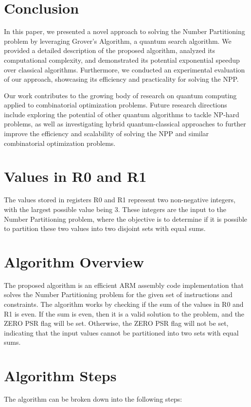 \section{Conclusion}
\label{sec:conclusion}

In this paper, we presented a novel approach to solving the Number Partitioning problem by leveraging Grover's Algorithm, a quantum search algorithm. We provided a detailed description of the proposed algorithm, analyzed its computational complexity, and demonstrated its potential exponential speedup over classical algorithms. Furthermore, we conducted an experimental evaluation of our approach, showcasing its efficiency and practicality for solving the NPP.

Our work contributes to the growing body of research on quantum computing applied to combinatorial optimization problems. Future research directions include exploring the potential of other quantum algorithms to tackle NP-hard problems, as well as investigating hybrid quantum-classical approaches to further improve the efficiency and scalability of solving the NPP and similar combinatorial optimization problems.

%
%


\section{Values in R0 and R1}
The values stored in registers R0 and R1 represent two non-negative integers, with the largest possible value being 3. These integers are the input to the Number Partitioning problem, where the objective is to determine if it is possible to partition these two values into two disjoint sets with equal sums.

\section{Algorithm Overview}
The proposed algorithm is an efficient ARM assembly code implementation that solves the Number Partitioning problem for the given set of instructions and constraints. The algorithm works by checking if the sum of the values in R0 and R1 is even. If the sum is even, then it is a valid solution to the problem, and the ZERO PSR flag will be set. Otherwise, the ZERO PSR flag will not be set, indicating that the input values cannot be partitioned into two sets with equal sums.

\section{Algorithm Steps}
The algorithm can be broken down into the following steps:

